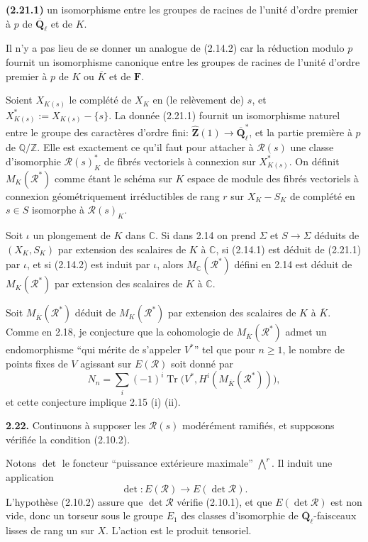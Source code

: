 \documentclass[11pt]{article}
\newcommand{\F}{\mathbf{F}}
\newcommand{\Qbl}{\overline{\mathbf{Q}}_{\ell}}
\newcommand{\Tr}{\operatorname{Tr}}
\newcommand{\Q}{\mathbb{Q}}
\newcommand{\Z}{\mathbb{Z}}
\newcommand{\Zhat}{\widehat{\mathbf{Z}}}
\newcommand{\C}{\mathbb{C}}
\newcommand{\Rcal}{\mathcal{R}}
\newcommand{\para}[1]{\medskip\noindent\textbf{#1}\enspace}
\begin{document}
\para{(2.21.1)} un isomorphisme entre les groupes de racines de l'unité d'ordre premier à \(p\) de \(\Qbl\) et de \(K\).

Il n'y a pas lieu de se donner un analogue de (2.14.2) car la réduction modulo \(p\) fournit un isomorphisme canonique entre les groupes de racines de l'unité d'ordre premier à \(p\) de \(K\) ou \(\overline K\) et de \(\F\).

Soient \(X_{K(s)}\) le complété de \(X_K\) en (le relèvement de) \(s\), et \(X_{K(s)}^*:=X_{K(s)}-\{s\}\). La donnée (2.21.1) fournit un isomorphisme naturel entre le groupe des caractères d'ordre fini: \(\Zhat(1)\to\Qbl^*\), et la partie première à \(p\) de \(\Q/\Z\). Elle est exactement ce qu'il faut pour attacher à \(\Rcal(s)\) une classe d'isomorphie \(\Rcal(s)^*_K\) de fibrés vectoriels à connexion sur \(X_{K(s)}^*\). On définit \(M_K(\Rcal^*)\) comme étant le schéma sur \(K\) espace de module des fibrés vectoriels à connexion géométriquement irréductibles de rang \(r\) sur \(X_K-S_K\) de complété en \(s\in S\) isomorphe à \(\Rcal(s)_K\).

Soit \(\iota\) un plongement de \(K\) dans \(\C\). Si dans 2.14 on prend \(\Sigma\) et \(S\to\Sigma\) déduits de \((X_K,S_K)\) par extension des scalaires de \(K\) à \(\C\), si (2.14.1) est déduit de (2.21.1) par \(\iota\), et si (2.14.2) est induit par \(\iota\), alors \(M_\C(\Rcal^*)\) défini en 2.14 est déduit de \(M_K(\Rcal^*)\) par extension des scalaires de \(K\) à \(\C\).

Soit \(M_{\overline K}(\Rcal^*)\) déduit de \(M_K(\Rcal^*)\) par extension des scalaires de \(K\) à \(\overline K\). Comme en 2.18, je conjecture que la cohomologie de \(M_{\overline K}(\Rcal^*)\) admet un endomorphisme ``qui mérite de s'appeler \(V^*\)'' tel que pour \(n\geq 1\), le nombre de points fixes de \(V\) agissant sur \(E(\Rcal)\) soit donné par
\begin{equation}
N_n=\sum_i(-1)^i\Tr\bigl(V^*,H^i(M_{\overline K}(\Rcal^*))\bigr),
\tag{2.21.2}
\end{equation}
et cette conjecture implique 2.15 (i) (ii).

\para{2.22.} Continuons à supposer les \(\Rcal(s)\) modérément ramifiés, et supposons vérifiée la condition (2.10.2).

Notons \(\det\) le foncteur ``puissance extérieure maximale'' \(\bigwedge^r\). Il induit une application
\begin{equation}
\det:E(\Rcal)\to E(\det\Rcal).
\tag{2.22.1}
\end{equation}
L'hypothèse (2.10.2) assure que \(\det\Rcal\) vérifie (2.10.1), et que \(E(\det\Rcal)\) est non vide, donc un torseur sous le groupe \(E_1\) des classes d'isomorphie de \(\Qbl\)-faisceaux lisses de rang un sur \(X\). L'action est le produit tensoriel.
\end{document}
